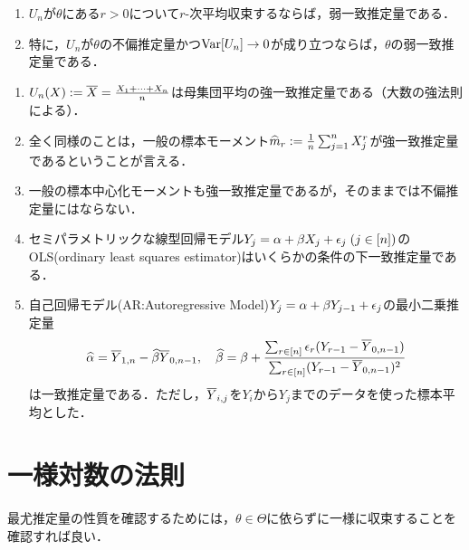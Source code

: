 \documentclass[uplatex,dvipdfmx]{jsreport}
\begin{document}
\begin{lemma}[確率収束の消息を統計の言葉で表現]\mbox{}
    \begin{enumerate}
        \item $U_n$が$\theta$にある$r>0$について$r$-次平均収束するならば，弱一致推定量である．
        \item 特に，$U_n$が$\theta$の不偏推定量かつ$\mathrm{Var}[U_n]\to0$が成り立つならば，$\theta$の弱一致推定量である．
    \end{enumerate}
\end{lemma}

\begin{example}[一致推定量]\mbox{}
    \begin{enumerate}
        \item $U_n(X):=\overline{X}=\frac{X_1+\cdots+X_n}{n}$は母集団平均の強一致推定量である（大数の強法則による）．
        \item 全く同様のことは，一般の標本モーメント$\widehat{m}_r:=\frac{1}{n}\sum^n_{j=1}X_j^r$が強一致推定量であるということが言える．
        \item 一般の標本中心化モーメントも強一致推定量であるが，そのままでは不偏推定量にはならない．
        \item セミパラメトリックな線型回帰モデル$Y_j=\alpha+\beta X_j+\epsilon_j\;(j\in[n])$のOLS(ordinary least squares estimator)はいくらかの条件の下一致推定量である．
        \item 自己回帰モデル(AR:Autoregressive Model)$Y_j=\alpha+\beta Y_{j-1}+\epsilon_j$の最小二乗推定量
        \[\widehat{\alpha}=\overline{Y}_{1,n}-\widehat{\beta}\overline{Y}_{0,n-1},\quad\widehat{\beta}=\beta+\frac{\sum_{r\in[n]}\epsilon_r(Y_{r-1}-\overline{Y}_{0,n-1})}{\sum_{r\in[n]}(Y_{r-1}-\overline{Y}_{0,n-1})^2}\]
        は一致推定量である．ただし，$\overline{Y}_{i,j}$を$Y_i$から$Y_j$までのデータを使った標本平均とした．
    \end{enumerate}
\end{example}

\section{一様対数の法則}

\begin{tcolorbox}[colframe=ForestGreen, colback=ForestGreen!10!white,breakable,colbacktitle=ForestGreen!40!white,coltitle=black,fonttitle=\bfseries\sffamily,
title=]
    最尤推定量の性質を確認するためには，$\theta\in\Theta$に依らずに一様に収束することを確認すれば良い．
\end{tcolorbox}
\end{document}
